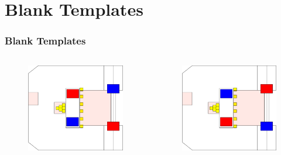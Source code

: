 \documentclass{beamer}
\begin{document}
\section{Blank Templates}

\begin{frame}
 \frametitle{Blank Templates}
 \begin{columns}
  \begin{figure}
   \includegraphics[scale=0.15]{assets/paths/BLANK_LR}
  \end{figure}
  \begin{figure}
   \includegraphics[scale=0.15]{assets/paths/BLANK_RL}

\end{figure}
\end{columns}
\end{frame}
\end{document}
